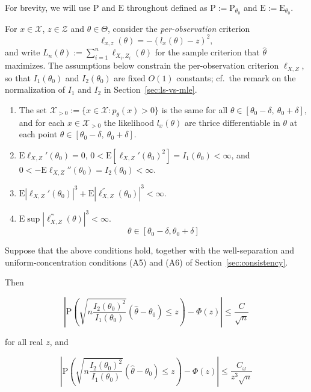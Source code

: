 For brevity, we will use $\mathrm{P}$ and $\mathrm{E}$ throughout defined as $\mathrm{P} :=\mathrm{P}_{\theta_{0}}$ and $\mathrm{E} :=\mathrm{E}_{\theta_{0}}.$

For $x\in \mathcal{X}$, $z\in\mathcal{Z}$ and $\theta\in \Theta$, consider the
\emph{per-observation} criterion
$$
\ell_{x,z}(\theta)=- (l_x(\theta)-z)^2 ,
$$
and write $L_n(\theta):=\sum_{i=1}^{n}\ell_{X_i,Z_i}(\theta)$ for the sample
criterion that $\hat\theta$ maximizes. The assumptions below constrain the
per-observation criterion $\ell_{X,Z}$, so that $I_1(\theta_0)$ and
$I_2(\theta_0)$ are fixed $O(1)$ constants; cf.\ the remark on the
normalization of $I_1$ and $I_2$ in Section~\ref{sec:ls-vs-mle}.

\begin{enumerate}
	\item The set $\mathcal{X}_{>0} :=\{x\in \mathcal{X}:p_{\theta}(x)>0\}$ is the same for all $\theta\in [\theta_{0}-\delta,\ \theta_{0}+\delta],$ and for each $x\in \mathcal{X}_{>0}$ the likelihood $l_{x}(\theta)$ are thrice differentiable in $\theta$ at each point $\theta\in [\theta_{0}-\delta,\ \theta_{0}+\delta].$
	\item $\mathrm{E}\ell_{X,Z}'(\theta_0)=0$, $0<\mathrm{E}[\ell_{X,Z}'(\theta_0)^2]=I_1(\theta_0)<\infty$, and $0<-\mathrm{E}\ell_{X,Z}''(\theta_0)=I_2(\theta_0)<\infty$.
	\item $\mathrm{E}|\ell_{X,Z}'(\theta_{0})|^{3}+\mathrm{E}|\ell_{X,Z}^{''}(\theta_{0})|^{3}<\infty.$
	\item $\mathrm{E} \sup |\ell_{X,Z}^{'''}(\theta)|^{3}<\infty.$
	$$
	\theta\in [\theta_0-\delta,\theta_0+\delta]
	$$
\end{enumerate}

Suppose that the above conditions hold, together with the well-separation and uniform-concen\-tration conditions (A5) and (A6) of Section~\ref{sec:consistency}.


Then

$$|\mathrm{P}\left(\sqrt{n \frac{I_2(\theta_{0})^2}{I_1(\theta_0)}}(\hat{\theta}-\theta_{0})\leq z\right)-\Phi(z)|\leq\frac{C}{\sqrt{n}}$$

for all real $z$, and

$$|\mathrm{P}(\sqrt{n\frac{I_2(\theta_{0})^2}{I_1(\theta_0)}}(\hat{\theta}-\theta_{0})\leq z)-\Phi(z)|\leq\frac{C_{\omega}}{z^3 \sqrt{n}}$$

